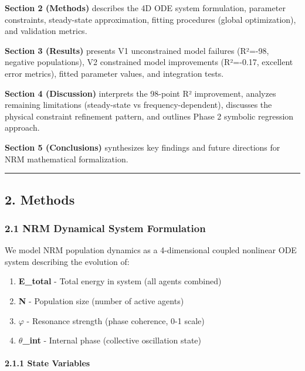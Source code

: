 \documentclass[
]{article}
\providecommand{\tightlist}{%
  \setlength{\itemsep}{0pt}\setlength{\parskip}{0pt}}
\begin{document}
\textbf{Section 2 (Methods)} describes the 4D ODE system formulation,
parameter constraints, steady-state approximation, fitting procedures
(global optimization), and validation metrics.

\textbf{Section 3 (Results)} presents V1 unconstrained model failures
(R²=-98, negative populations), V2 constrained model improvements
(R²=-0.17, excellent error metrics), fitted parameter values, and
integration tests.

\textbf{Section 4 (Discussion)} interprets the 98-point R² improvement,
analyzes remaining limitations (steady-state vs frequency-dependent),
discusses the physical constraint refinement pattern, and outlines Phase
2 symbolic regression approach.

\textbf{Section 5 (Conclusions)} synthesizes key findings and future
directions for NRM mathematical formalization.

\begin{center}\rule{0.5\linewidth}{0.5pt}\end{center}

\subsection{2. Methods}\label{methods}

\subsubsection{2.1 NRM Dynamical System
Formulation}\label{nrm-dynamical-system-formulation}

We model NRM population dynamics as a 4-dimensional coupled nonlinear
ODE system describing the evolution of:

\begin{enumerate}
\def\labelenumi{\arabic{enumi}.}
\tightlist
\item
  \textbf{E\_total} - Total energy in system (all agents combined)
\item
  \textbf{N} - Population size (number of active agents)
\item
  \textbf{$\varphi$} - Resonance strength (phase coherence, 0-1 scale)
\item
  \textbf{$\theta$\_int} - Internal phase (collective oscillation state)
\end{enumerate}

\paragraph{2.1.1 State Variables}\label{state-variables}
\end{document}
